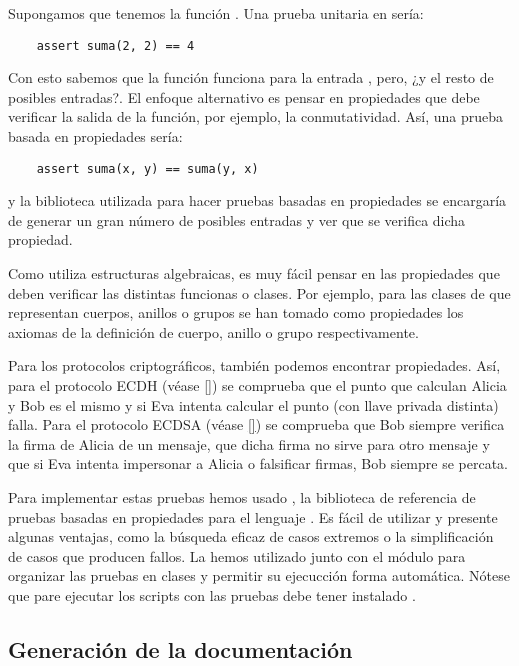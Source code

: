 \begin{ejemplo}
    Supongamos que tenemos la función . Una prueba unitaria en  sería:
    \begin{verbatim}    assert suma(2, 2) == 4\end{verbatim}
    Con esto sabemos que la función  funciona para la entrada , pero, ¿y el resto de posibles entradas?. El enfoque alternativo es pensar en propiedades que debe verificar la salida de la función, por ejemplo, la conmutatividad. Así, una prueba basada en propiedades sería:
    \begin{verbatim}    assert suma(x, y) == suma(y, x)\end{verbatim}
    y la biblioteca utilizada para hacer pruebas basadas en propiedades se encargaría de generar un gran número de posibles entradas y ver que se verifica dicha propiedad.
\end{ejemplo}

Como  utiliza estructuras algebraicas, es muy fácil pensar en las propiedades que deben verificar las distintas funcionas o clases. Por ejemplo, para las clases de  que representan cuerpos, anillos o grupos se han tomado como propiedades los axiomas de la definición de cuerpo, anillo o grupo respectivamente.

Para los protocolos criptográficos, también podemos encontrar propiedades. Así, para el protocolo ECDH (véase \ref{}) se comprueba que el punto que calculan Alicia y Bob es el mismo y si Eva intenta calcular el punto (con llave privada distinta) falla. Para el protocolo ECDSA (véase \ref{}) se comprueba que Bob siempre verifica la firma de Alicia de un mensaje, que dicha firma no sirve para otro mensaje y que si Eva intenta impersonar a Alicia o falsificar firmas, Bob siempre se percata.

Para implementar estas pruebas hemos usado , la biblioteca de referencia de pruebas basadas en propiedades para el lenguaje . Es fácil de utilizar y presente algunas ventajas, como la búsqueda eficaz de casos extremos o la simplificación de casos que producen fallos. La hemos utilizado junto con el módulo  para organizar las pruebas en clases y permitir su ejecucción forma automática. Nótese que pare ejecutar los scripts con las pruebas debe tener instalado .

\subsection{Generación de la documentación}
\label{sub:Generación de la documentación}

